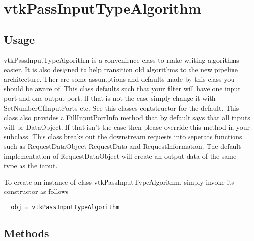 \section{vtkPassInputTypeAlgorithm}

\subsection{Usage}

 vtkPassInputTypeAlgorithm is a convenience class to make writing algorithms
 easier. It is also designed to help transition old algorithms to the new
 pipeline architecture. Ther are some assumptions and defaults made by this
 class you should be aware of. This class defaults such that your filter
 will have one input port and one output port. If that is not the case
 simply change it with SetNumberOfInputPorts etc. See this classes
 contstructor for the default. This class also provides a FillInputPortInfo
 method that by default says that all inputs will be DataObject. If that isn't
 the case then please override this method in your subclass. This class
 breaks out the downstream requests into seperate functions such as
 RequestDataObject RequestData and RequestInformation. The default
 implementation of RequestDataObject will create an output data of the 
 same type as the input.

To create an instance of class vtkPassInputTypeAlgorithm, simply
invoke its constructor as follows
\begin{verbatim}
  obj = vtkPassInputTypeAlgorithm
\end{verbatim}
\subsection{Methods}

